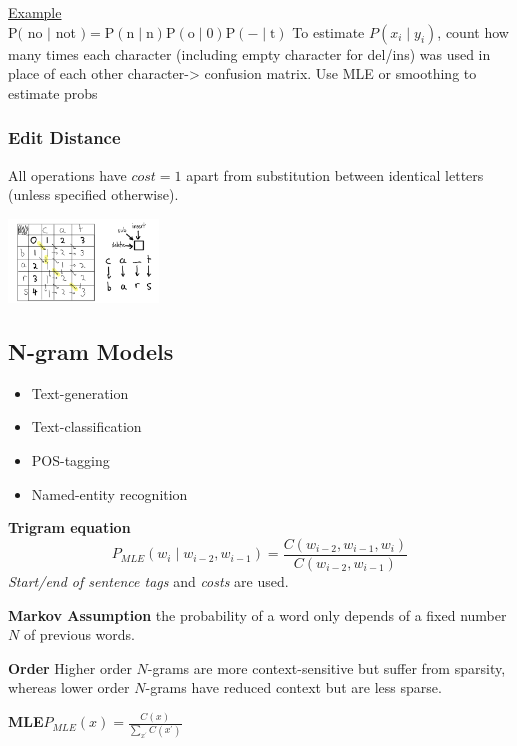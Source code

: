 \documentclass[8pt]{extarticle} %
\begin{document}
\begin{multicols*}{3}
\underline{Example}\\
$\mathrm{P}($ no $\mid$ not $)=\mathrm{P}(\mathrm{n} \mid \mathrm{n}) \mathrm{P}(\mathrm{o} \mid 0) \mathrm{P}(-\mid \mathrm{t})$
To estimate $P\left(x_i \mid y_i\right)$, count how many times each character (including empty character for del/ins) was used in place of each other character-> confusion matrix. Use MLE or smoothing to estimate probs\\

\subsubsection*{Edit Distance}
All operations have $cost = 1$ apart from substitution between identical letters (unless specified otherwise).
\begin{center}
    \includegraphics[width=0.3\textwidth]{media/edit.jpg}
\end{center}

\subsection*{N-gram Models}
\begin{itemize}[label=\textbullet, labelsep=0.3em, leftmargin=0.5em, itemsep=0em]
    \item Text-generation
    \item Text-classification
    \item POS-tagging
    \item Named-entity recognition  
\end{itemize}
\textbf{Trigram equation}$$P_{M L E}\left(w_i \mid w_{i-2}, w_{i-1}\right)=\frac{C\left(w_{i-2}, w_{i-1}, w_i\right)}{C\left(w_{i-2}, w_{i-1}\right)}$$
\textit{Start/end of sentence tags} and \textit{costs} are used. 

\textbf{Markov Assumption} the probability of a word only depends of a fixed number $N$ of previous words. 

\textbf{Order} Higher order $N$-grams are more context-sensitive but suffer from sparsity, whereas lower order $N$-grams have reduced context but are less sparse.

\textbf{MLE}$P_{M L E}(x)=\frac{C(x)}{\sum_{x^{\prime}} C\left(x^{\prime}\right)}$


\end{multicols*}
\end{document}
